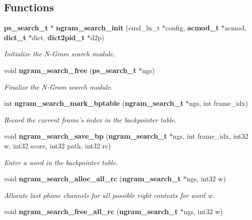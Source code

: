 \subsection*{Functions}
\begin{DoxyCompactItemize}
\item 
{\bf ps\-\_\-search\-\_\-t} $\ast$ {\bf ngram\-\_\-search\-\_\-init} (cmd\-\_\-ln\-\_\-t $\ast$config, {\bf acmod\-\_\-t} $\ast$acmod, {\bf dict\-\_\-t} $\ast$dict, {\bf dict2pid\-\_\-t} $\ast$d2p)\label{ngram__search_8h_afa0dcbb86340083bce1412c9309742bc}

\begin{DoxyCompactList}\small\item\em Initialize the N-\/\-Gram search module. \end{DoxyCompactList}\item 
void {\bf ngram\-\_\-search\-\_\-free} ({\bf ps\-\_\-search\-\_\-t} $\ast$ngs)\label{ngram__search_8h_a9bafaa4af5a9a4f9e76a8daf54ac4a11}

\begin{DoxyCompactList}\small\item\em Finalize the N-\/\-Gram search module. \end{DoxyCompactList}\item 
int {\bf ngram\-\_\-search\-\_\-mark\-\_\-bptable} ({\bf ngram\-\_\-search\-\_\-t} $\ast$ngs, int frame\-\_\-idx)
\begin{DoxyCompactList}\small\item\em Record the current frame's index in the backpointer table. \end{DoxyCompactList}\item 
void {\bf ngram\-\_\-search\-\_\-save\-\_\-bp} ({\bf ngram\-\_\-search\-\_\-t} $\ast$ngs, int frame\-\_\-idx, int32 w, int32 score, int32 path, int32 rc)\label{ngram__search_8h_ae36649be6f5a2190e759e7ed13bd7b6b}

\begin{DoxyCompactList}\small\item\em Enter a word in the backpointer table. \end{DoxyCompactList}\item 
void {\bf ngram\-\_\-search\-\_\-alloc\-\_\-all\-\_\-rc} ({\bf ngram\-\_\-search\-\_\-t} $\ast$ngs, int32 w)\label{ngram__search_8h_a1ddcc1a9cb3e164ceb2140097ed23a3e}

\begin{DoxyCompactList}\small\item\em Allocate last phone channels for all possible right contexts for word w. \end{DoxyCompactList}\item 
void {\bf ngram\-\_\-search\-\_\-free\-\_\-all\-\_\-rc} ({\bf ngram\-\_\-search\-\_\-t} $\ast$ngs, int32 w)\label{ngram__search_8h_a15477192481dffcb29e9c4167eff6c3c}


\end{DoxyCompactItemize}
